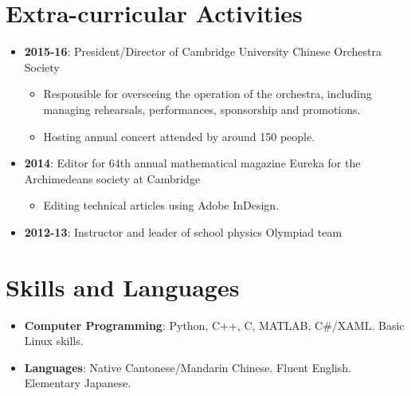 \documentclass[letterpaper,11pt,oneside]{article}
\begin{document}
\section*{Extra-curricular Activities}
\begin{itemize}

\item \textbf{2015-16}: President/Director of Cambridge University Chinese Orchestra Society
\begin{itemize}
\item Responsible for overseeing the operation of the orchestra, including managing rehearsals, performances, sponsorship and promotions.
\item Hosting annual concert attended by around 150 people.
\end{itemize}
\item \textbf{2014}: Editor for 64th annual mathematical magazine Eureka for the Archimedeans society at Cambridge
\begin{itemize}
\item Editing technical articles using Adobe InDesign.
\end{itemize}
\item \textbf{2012-13}: Instructor and leader of school physics Olympiad team

\end{itemize}

\section*{Skills and Languages}
\begin{itemize}
\item \textbf{Computer Programming}: Python, C++, C, MATLAB, C\#/XAML. Basic Linux skills.
\item \textbf{Languages}: Native Cantonese/Mandarin Chinese. Fluent English. Elementary Japanese.
\end{itemize}
\end{document}
